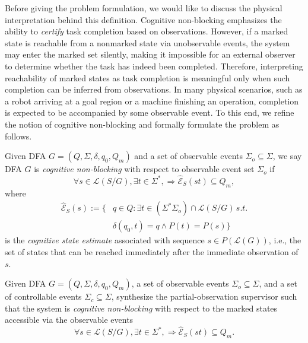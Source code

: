 \documentclass[journal,twoside,web]{ieeecolor}
\begin{document}
Before giving the problem formulation, we would like to discuss the physical interpretation behind this definition.
Cognitive non-blocking emphasizes the ability to \emph{certify} task completion based on observations.
%
However, if a marked state is reachable from a nonmarked state via unobservable events, the system may enter the marked set silently, making it impossible for an external observer to determine whether the task has indeed been completed.
Therefore, interpreting reachability of marked states as task completion is meaningful only when such completion can be inferred from observations.
% 
In many physical scenarios, such as a robot arriving at a goal region or a machine finishing an operation, completion is expected to be accompanied by some observable event.
%
To this end, we refine the notion of cognitive non-blocking and formally formulate the problem as follows.
%
\begin{definition}
    Given DFA $G = (Q, \Sigma, \delta, q_0, Q_m)$ and a set of observable events $\Sigma_o \subseteq \Sigma$, we say DFA $G$ is \textit{cognitive non-blocking} with respect to observable event set $\Sigma_o$ if
    \begin{equation}\label{eq:cnb_1}
    \forall s \in \mathcal{L}(S/G), \exists t \in \Sigma^*, \Rightarrow \hat{\mathcal{E}}_S(st) \subseteq Q_m,
    \end{equation}
    where
    \begin{equation}\label{eq:est_o}
    \begin{aligned}
    \hat{\mathcal{E}}_S(s) := \{ 
    &q \in Q : \exists t \in (\Sigma^*\Sigma_o) \cap \mathcal{L}(S / G) \, s.t. \\ 
    &\delta(q_0, t) = q \wedge P(t) = P(s) \}
    \end{aligned}
    \end{equation} 
    is the \emph{cognitive state estimate} associated with sequence $s \in P(\mathcal{L}(G))$, i.e., the set of states that can be reached immediately after the immediate observation of $s$.       
    \label{def:cnb}
\end{definition}
%
\begin{problem}
    Given DFA $G = (Q, \Sigma, \delta, q_0, Q_m)$, a set of observable events $\Sigma_o \subseteq \Sigma$, and a set of controllable events $\Sigma_c \subseteq \Sigma$, synthesize the partial-observation supervisor such that the system is \textit{cognitive non-blocking} with respect to the marked states accessible via the observable events
    \begin{equation}
    \forall s \in \mathcal{L}(S/G), \exists t \in \Sigma^*, \Rightarrow \hat{\mathcal{E}}_S(st) \subseteq Q_m.
    \end{equation}
    \label{prob:cnb}
\end{problem}
\end{document}
